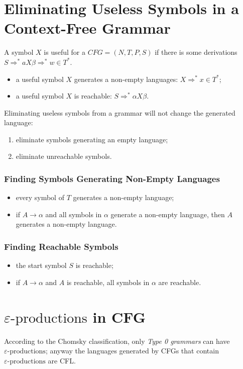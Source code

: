 \section{Eliminating Useless Symbols in a Context-Free Grammar}
A symbol $X$ is useful for a $CFG = (N, T, P, S)$ if there is some derivations $S \Rightarrow^\ast aX\beta \Rightarrow^\ast w \in T^\ast$.
\begin{itemize}
    \item a useful symbol $X$ generates a non-empty languages: $X \Rightarrow^\ast x \in T^\ast$;
    \item a useful symbol $X$ is reachable: $S \Rightarrow^\ast \alpha X\beta$.
\end{itemize}
Eliminating useless symbols from a grammar will not change the generated language:
\begin{enumerate}
    \item eliminate symbols generating an empty language;
    \item eliminate unreachable symbols.
\end{enumerate}
\subsubsection{Finding Symbols Generating Non-Empty Languages}
\begin{itemize}
    \item every symbol of $T$ generates a non-empty language;
    \item if $A \to \alpha$ and all symbols in $\alpha$ generate a non-empty language, then $A$ generates a non-empty language.
\end{itemize}
\subsubsection{Finding Reachable Symbols}
\begin{itemize}
    \item the start symbol $S$ is reachable;
    \item if $A \to \alpha$ and $A$ is reachable, all symbols in $\alpha$ are reachable.
\end{itemize}

\section{$\varepsilon\text{-productions}$ in CFG}
According to the Chomsky classification, only \emph{Type 0 grammars} can have $\varepsilon\text{-productions}$; anyway the languages generated by CFGs that contain $\varepsilon\text{-productions}$ are CFL.

